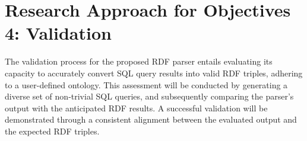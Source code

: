 \section{Research Approach for Objectives 4: Validation}

The validation process for the proposed RDF parser entails evaluating its capacity to accurately convert SQL query results into valid RDF triples, adhering to a user-defined ontology.  This assessment will be conducted by generating a diverse set of non-trivial SQL queries, and subsequently comparing the parser's output with the anticipated RDF results. A successful validation will be demonstrated through a consistent alignment between the evaluated output and the expected RDF triples.


